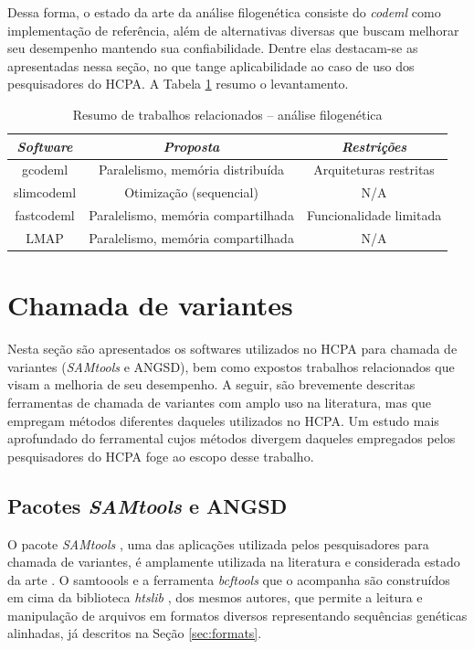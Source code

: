 \documentclass[cic,tc]{iiufrgs}
\begin{document}
Dessa forma, o estado da arte da análise filogenética consiste do \textit{codeml} como
implementação de referência, além de alternativas diversas que buscam melhorar
seu desempenho mantendo sua confiabilidade. Dentre elas destacam-se as
apresentadas nessa seção, no que tange aplicabilidade ao caso de uso dos
pesquisadores do HCPA. A Tabela \ref{tbl:filolit} resumo o levantamento.

\begin{table}[h]
  \caption{Resumo de trabalhos relacionados -- análise filogenética}
    \centering
        \begin{tabular}{c|c|c}
          \hline
          \textit{Software}  & \textit{Proposta} & \textit{Restrições}  \\
          \hline
          \hline
          gcodeml     & Paralelismo, memória distribuída     & Arquiteturas restritas  \\
          slimcodeml  & Otimização (sequencial)              & N/A \\
          fastcodeml  & Paralelismo, memória compartilhada   & Funcionalidade limitada \\
          LMAP        & Paralelismo, memória compartilhada   & N/A \\
          \hline
        \end{tabular}
    \label{tbl:filolit}
\end{table}

\section{Chamada de variantes}
\label{sec:callant}

Nesta seção são apresentados os softwares utilizados no HCPA para
chamada de variantes (\textit{SAMtools} e ANGSD), bem como expostos trabalhos
relacionados que visam a melhoria de seu desempenho. A seguir, são brevemente
descritas ferramentas de chamada de variantes com amplo uso na literatura, mas
que empregam métodos diferentes daqueles utilizados no HCPA. Um estudo mais
aprofundado do ferramental cujos métodos divergem daqueles empregados pelos
pesquisadores do HCPA foge ao escopo desse trabalho.

\subsection{Pacotes \textit{SAMtools} e ANGSD}

O pacote \textit{SAMtools} \cite{li2009sequence}, uma das aplicações utilizada pelos
pesquisadores para chamada de variantes, é amplamente utilizada na literatura
\cite{danecek2021twelve} e considerada estado da arte \cite{yao2020evaluation}.
O samtoools e a ferramenta \textit{bcftools} que o acompanha são construídos em cima da
biblioteca \textit{htslib} \cite{bonfield2021htslib}, dos mesmos autores, que permite a
leitura e manipulação de arquivos em formatos diversos representando sequências
genéticas alinhadas, já descritos na Seção \ref{sec:formats}.
\end{document}
